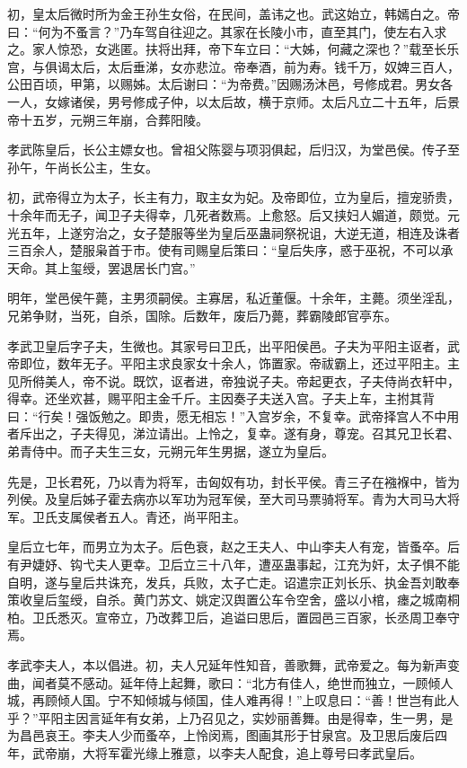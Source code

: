 \documentclass[]{article}
\begin{document}
初，皇太后微时所为金王孙生女俗，在民间，盖讳之也。武这始立，韩嫣白之。帝曰：``何为不蚤言？''乃车驾自往迎之。其家在长陵小市，直至其门，使左右入求之。家人惊恐，女逃匿。扶将出拜，帝下车立曰：``大姊，何藏之深也？''载至长乐宫，与俱谒太后，太后垂涕，女亦悲泣。帝奉酒，前为寿。钱千万，奴婢三百人，公田百顷，甲第，以赐姊。太后谢曰：``为帝费。''因赐汤沐邑，号修成君。男女各一人，女嫁诸侯，男号修成子仲，以太后故，横于京师。太后凡立二十五年，后景帝十五岁，元朔三年崩，合葬阳陵。

孝武陈皇后，长公主嫖女也。曾祖父陈婴与项羽俱起，后归汉，为堂邑侯。传子至孙午，午尚长公主，生女。

初，武帝得立为太子，长主有力，取主女为妃。及帝即位，立为皇后，擅宠骄贵，十余年而无子，闻卫子夫得幸，几死者数焉。上愈怒。后又挟妇人媚道，颇觉。元光五年，上遂穷治之，女子楚服等坐为皇后巫蛊祠祭祝诅，大逆无道，相连及诛者三百余人，楚服枭首于市。使有司赐皇后策曰：``皇后失序，惑于巫祝，不可以承天命。其上玺绶，罢退居长门宫。''

明年，堂邑侯午薨，主男须嗣侯。主寡居，私近董偃。十余年，主薨。须坐淫乱，兄弟争财，当死，自杀，国除。后数年，废后乃薨，葬霸陵郎官亭东。

孝武卫皇后字子夫，生微也。其家号曰卫氏，出平阳侯邑。子夫为平阳主讴者，武帝即位，数年无子。平阳主求良家女十余人，饰置家。帝祓霸上，还过平阳主。主见所偫美人，帝不说。既饮，讴者进，帝独说子夫。帝起更衣，子夫侍尚衣轩中，得幸。还坐欢甚，赐平阳主金千斤。主因奏子夫送入宫。子夫上车，主拊其背曰：``行矣！强饭勉之。即贵，愿无相忘！''入宫岁余，不复幸。武帝择宫人不中用者斥出之，子夫得见，涕泣请出。上怜之，复幸。遂有身，尊宠。召其兄卫长君、弟青侍中。而子夫生三女，元朔元年生男据，遂立为皇后。

先是，卫长君死，乃以青为将军，击匈奴有功，封长平侯。青三子在襁褓中，皆为列侯。及皇后姊子霍去病亦以军功为冠军侯，至大司马票骑将军。青为大司马大将军。卫氏支属侯者五人。青还，尚平阳主。

皇后立七年，而男立为太子。后色衰，赵之王夫人、中山李夫人有宠，皆蚤卒。后有尹婕妤、钩弋夫人更幸。卫后立三十八年，遭巫蛊事起，江充为奸，太子惧不能自明，遂与皇后共诛充，发兵，兵败，太子亡走。诏遣宗正刘长乐、执金吾刘敢奉策收皇后玺绶，自杀。黄门苏文、姚定汉舆置公车令空舍，盛以小棺，瘗之城南桐柏。卫氏悉灭。宣帝立，乃改葬卫后，追谥曰思后，置园邑三百家，长丞周卫奉守焉。

孝武李夫人，本以倡进。初，夫人兄延年性知音，善歌舞，武帝爱之。每为新声变曲，闻者莫不感动。延年侍上起舞，歌曰：``北方有佳人，绝世而独立，一顾倾人城，再顾倾人国。宁不知倾城与倾国，佳人难再得！''上叹息曰：``善！世岂有此人乎？''平阳主因言延年有女弟，上乃召见之，实妙丽善舞。由是得幸，生一男，是为昌邑哀王。李夫人少而蚤卒，上怜闵焉，图画其形于甘泉宫。及卫思后废后四年，武帝崩，大将军霍光缘上雅意，以李夫人配食，追上尊号曰孝武皇后。
\end{document}
